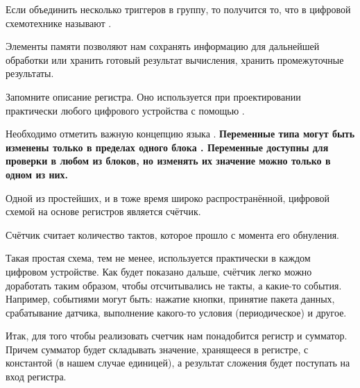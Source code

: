 \par{}

\par{Если объединить несколько триггеров в группу, то получится то, что в цифровой схемотехнике называют .}



\par{Элементы памяти позволяют нам сохранять информацию для дальнейшей обработки или хранить готовый результат вычисления, хранить промежуточные результаты.}

\par{Запомните описание регистра. Оно используется при проектировании практически любого цифрового устройства с помощью .}

\par{Необходимо отметить важную концепцию языка . \textbf{Переменные типа  могут быть изменены только в пределах одного блока . Переменные доступны для проверки в любом из блоков, но изменять их значение можно только в одном из них.}}



\par{Одной из простейших, и в тоже время широко распространённой, цифровой схемой на основе регистров является счётчик.}

\par{Счётчик считает количество тактов, которое прошло с момента его обнуления.}

\par{Такая простая схема, тем не менее, используется практически в каждом цифровом устройстве. Как будет показано дальше, счётчик легко можно доработать таким образом, чтобы отсчитывались не такты, а какие-то события. Например, событиями могут быть: нажатие кнопки, принятие пакета данных, срабатывание датчика, выполнение какого-то условия (периодическое) и другое.}


\par{Итак, для того чтобы реализовать счетчик нам понадобится регистр и сумматор. Причем сумматор будет складывать значение, хранящееся в регистре, с константой (в нашем случае единицей), а результат сложения будет поступать на вход регистра.}

